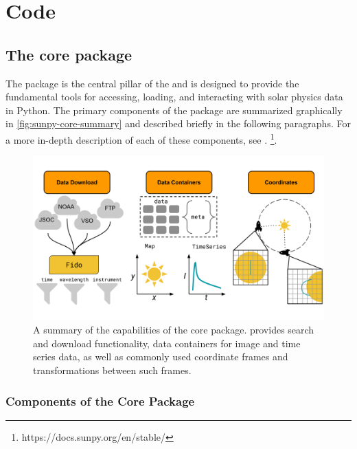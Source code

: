 \section{Code}
\label{sec:code}

\subsection{The \sunpypkg core package}
\label{ssec:the-sunpypkg-core-package}

The \sunpypkg package is the central pillar of the \sunpyproj \citep{sunpy_community2020} and is designed to provide the fundamental tools for accessing, loading, and interacting with solar physics data in Python.
The primary components of the \sunpypkg package are summarized graphically in \autoref{fig:sunpy-core-summary} and described briefly in the following paragraphs.
For a more in-depth description of each of these components, see \citet[Section 4]{sunpy_community2020}.
\footnote{https://docs.sunpy.org/en/stable/}.

\begin{figure}
    \centering
    \includegraphics[width=\columnwidth]{figures/sunpy-summary-slide.pdf}
    \caption{A summary of the capabilities of the \sunpypkg core package. \sunpypkg provides search and download functionality, data containers for image and time series data, as well as commonly used coordinate frames and transformations between such frames.}
    \label{fig:sunpy-core-summary}
\end{figure}

\subsubsection{Components of the Core Package}
\label{sssec:components-of-the-core-package}

